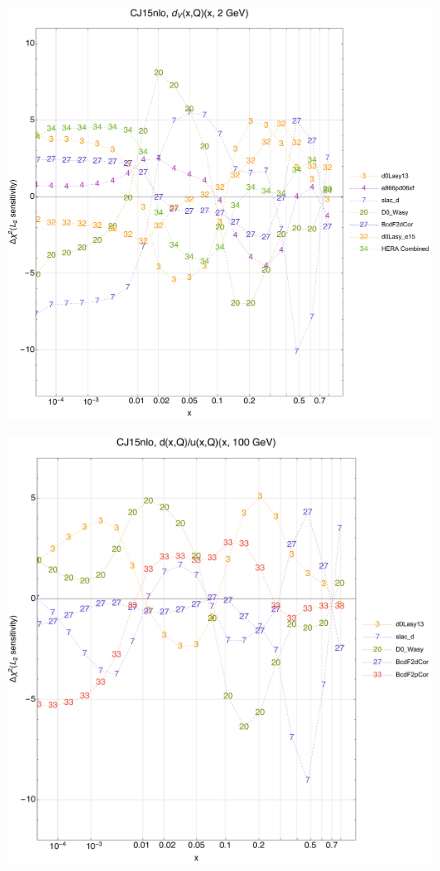 \documentclass[10pt,aps,prd,floatfix,titlepage]{revtex4}
\begin{document}
\begin{figure}
\includegraphics[width=\textwidth,height=0.44\textheight,keepaspectratio]{2/rat_ifl2_CJ15nlo_L2_q2_Sf_2.pdf}
\caption{}
\end{figure}
\clearpage
\begin{figure}
\includegraphics[width=\textwidth,height=0.44\textheight,keepaspectratio]{2/rat_ifl3_CJ15nlo_L2_q100_Sf_2.pdf}
\caption{}
\end{figure}
\end{document}
